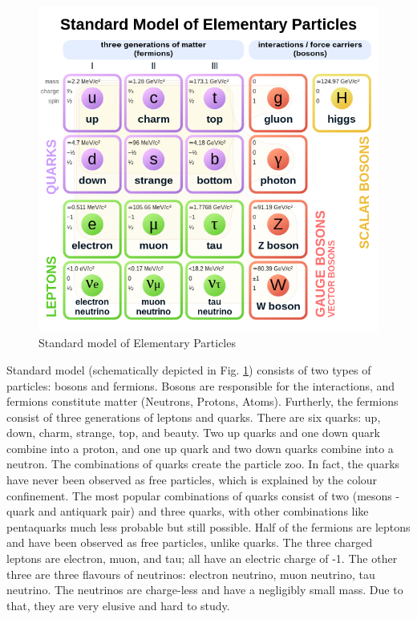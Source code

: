 \begin{figure}
  \centering
  \includegraphics[width=0.7\linewidth]{figures/chapter1/Standard_Model_of_Elementary_Particles.svg.png}
  \caption[caption for LOF]{Standard model of Elementary Particles \footnotemark}
  \label{fig:standard_model}
\end{figure}


Standard model (schematically depicted in Fig. \ref{fig:standard_model}) consists of two types of particles: bosons and fermions. Bosons are responsible for the interactions, and fermions constitute matter (Neutrons, Protons, Atoms).
Furtherly, the fermions consist of three generations of leptons and quarks.
There are six quarks: up, down, charm, strange, top, and beauty. Two up quarks and one down quark combine into a proton, and one up quark and two down quarks combine into a neutron.
The combinations of quarks create the particle zoo. In fact, the quarks have never been observed as free particles, which is explained by the colour confinement.
The most popular combinations of quarks consist of two (mesons - quark and antiquark pair) and three quarks, with other combinations like pentaquarks much less probable but still possible.
Half of the fermions are leptons and have been observed as free particles, unlike quarks. The three charged leptons are electron, muon, and tau; all have an electric charge of -1.
The other three are three flavours of neutrinos: electron neutrino, muon neutrino, tau neutrino.
The neutrinos are charge-less and have a negligibly small mass. Due to that, they are very elusive and hard to study.

